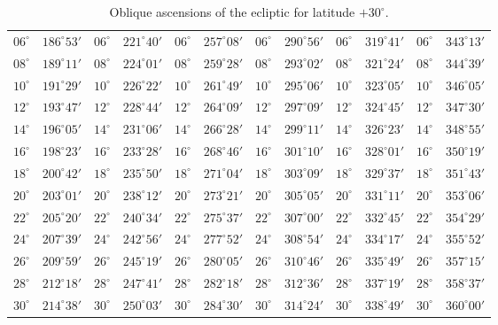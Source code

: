 \begin{table}[!h]
{\begin{tabular}{cc|cc|cc|cc|cc|cc}
$06^\circ$ & $186^\circ53'$ & $06^\circ$ & $221^\circ40'$ & $06^\circ$ & $257^\circ08'$ & $06^\circ$ & $290^\circ56'$ &  $06^\circ$ & $319^\circ41'$ & $06^\circ$ & $343^\circ13'$\\
$08^\circ$ & $189^\circ11'$ & $08^\circ$ & $224^\circ01'$ & $08^\circ$ & $259^\circ28'$ & $08^\circ$ & $293^\circ02'$ &  $08^\circ$ & $321^\circ24'$ & $08^\circ$ & $344^\circ39'$\\
$10^\circ$ & $191^\circ29'$ & $10^\circ$ & $226^\circ22'$ & $10^\circ$ & $261^\circ49'$ & $10^\circ$ & $295^\circ06'$ &  $10^\circ$ & $323^\circ05'$ & $10^\circ$ & $346^\circ05'$\\
$12^\circ$ & $193^\circ47'$ & $12^\circ$ & $228^\circ44'$ & $12^\circ$ & $264^\circ09'$ & $12^\circ$ & $297^\circ09'$ &  $12^\circ$ & $324^\circ45'$ & $12^\circ$ & $347^\circ30'$\\
$14^\circ$ & $196^\circ05'$ & $14^\circ$ & $231^\circ06'$ & $14^\circ$ & $266^\circ28'$ & $14^\circ$ & $299^\circ11'$ &  $14^\circ$ & $326^\circ23'$ & $14^\circ$ & $348^\circ55'$\\
$16^\circ$ & $198^\circ23'$ & $16^\circ$ & $233^\circ28'$ & $16^\circ$ & $268^\circ46'$ & $16^\circ$ & $301^\circ10'$ &  $16^\circ$ & $328^\circ01'$ & $16^\circ$ & $350^\circ19'$\\
$18^\circ$ & $200^\circ42'$ & $18^\circ$ & $235^\circ50'$ & $18^\circ$ & $271^\circ04'$ & $18^\circ$ & $303^\circ09'$ &  $18^\circ$ & $329^\circ37'$ & $18^\circ$ & $351^\circ43'$\\
$20^\circ$ & $203^\circ01'$ & $20^\circ$ & $238^\circ12'$ & $20^\circ$ & $273^\circ21'$ & $20^\circ$ & $305^\circ05'$ &  $20^\circ$ & $331^\circ11'$ & $20^\circ$ & $353^\circ06'$\\
$22^\circ$ & $205^\circ20'$ & $22^\circ$ & $240^\circ34'$ & $22^\circ$ & $275^\circ37'$ & $22^\circ$ & $307^\circ00'$ &  $22^\circ$ & $332^\circ45'$ & $22^\circ$ & $354^\circ29'$\\
$24^\circ$ & $207^\circ39'$ & $24^\circ$ & $242^\circ56'$ & $24^\circ$ & $277^\circ52'$ & $24^\circ$ & $308^\circ54'$ &  $24^\circ$ & $334^\circ17'$ & $24^\circ$ & $355^\circ52'$\\
$26^\circ$ & $209^\circ59'$ & $26^\circ$ & $245^\circ19'$ & $26^\circ$ & $280^\circ05'$ & $26^\circ$ & $310^\circ46'$ &  $26^\circ$ & $335^\circ49'$ & $26^\circ$ & $357^\circ15'$\\
$28^\circ$ & $212^\circ18'$ & $28^\circ$ & $247^\circ41'$ & $28^\circ$ & $282^\circ18'$ & $28^\circ$ & $312^\circ36'$ &  $28^\circ$ & $337^\circ19'$ & $28^\circ$ & $358^\circ37'$\\
$30^\circ$ & $214^\circ38'$ & $30^\circ$ & $250^\circ03'$ & $30^\circ$ & $284^\circ30'$ & $30^\circ$ & $314^\circ24'$ &  $30^\circ$ & $338^\circ49'$ & $30^\circ$ & $360^\circ00'$\\
\end{tabular}}
\caption{Oblique ascensions of the ecliptic for latitude $+30^\circ$.}\label{tz}
\end{table}

